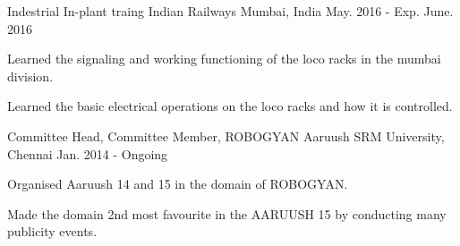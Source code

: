 \begin{cventries}
  \cventry
    {Indestrial In-plant traing}
    {Indian Railways}
    {Mumbai, India}
    {May. 2016 - Exp. June. 2016}
    {
      \begin{cvitems}
        \item {Learned the signaling and working functioning of the loco racks in the mumbai division.}
        \item {Learned the basic electrical operations on the loco racks and how it is controlled.}
      \end{cvitems}
    }
  \cventry
    {Committee Head, Committee Member, ROBOGYAN}
    {Aaruush}
    {SRM University, Chennai}
    {Jan. 2014 - Ongoing}
    {
      \begin{cvitems}
        \item {Organised Aaruush 14 and 15 in the domain of ROBOGYAN.}
        \item {Made the domain 2nd most favourite in the AARUUSH 15 by conducting many publicity events.}
      \end{cvitems}
    }
  \cventry
    {
      \begin{cvitems}
      \end{cvitems} 
    }
  \cventry
    {
      \begin{cvitems}
      \end{cvitems}
    }
  \cventry
    {
      \begin{cvitems}

\end{cvitems}}
\end{cventries}
